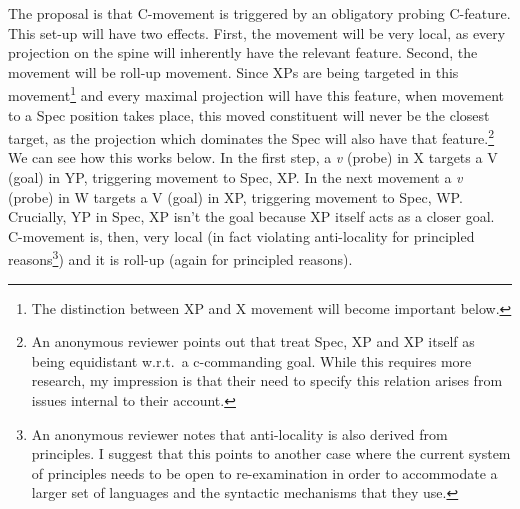 \documentclass[output=paper,colorlinks,citecolor=brown,
]{langscibook}
\begin{document}
The proposal is that C-movement is triggered by an obligatory probing C-feature.  This set-up will have two effects.  First, the movement will be very local, as every projection on the spine will inherently have the relevant feature.  Second, the movement will be roll-up movement.  Since XPs are being targeted in this movement\footnote{The distinction between XP and X movement will become important below.} and every maximal projection will have this feature, when movement to a Spec position takes place, this moved constituent will never be the closest target, as the projection which dominates the Spec will also have that feature.\footnote{An anonymous reviewer points out that  \citet{Rackowski:2005} treat Spec, XP and XP itself as being equidistant w.r.t.\ a c-commanding goal. While this requires more research, my impression is that their need to specify this relation arises from issues internal to their account.}  We can see how this works below.   In the first step, a \textit{v} (probe) in X targets a V (goal) in YP, triggering movement to Spec, XP.  In the next movement a \textit{v} (probe) in W targets a V (goal) in XP, triggering movement to Spec, WP. Crucially, YP in Spec, XP isn't the goal because XP itself acts as a closer goal.  C-movement is, then, very local (in fact violating anti-locality for principled reasons\footnote{An anonymous reviewer notes that anti-locality is also derived from principles. I suggest that this points to another case where the current system of principles needs to be open to re-examination in order to accommodate a larger set of languages and the syntactic mechanisms that they use.}) and it is roll-up (again for principled reasons).
\end{document}
